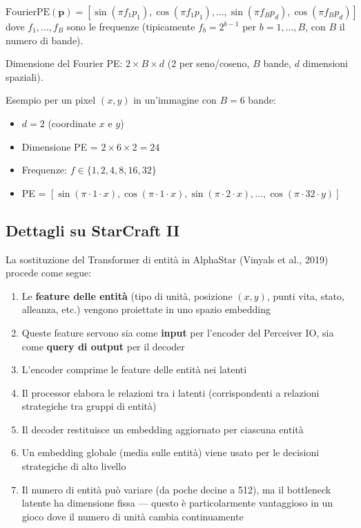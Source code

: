 \documentclass[12pt,a4paper]{article}
\begin{document}
\begin{formulabox}
\[
\text{FourierPE}(\mathbf{p}) = \left[\sin(\pi f_1 p_1), \cos(\pi f_1 p_1), \ldots, \sin(\pi f_B p_d), \cos(\pi f_B p_d)\right]
\]
dove $f_1, \ldots, f_B$ sono le frequenze (tipicamente $f_b = 2^{b-1}$ per $b = 1, \ldots, B$, con $B$ il numero di bande).

Dimensione del Fourier PE: $2 \times B \times d$ (2 per seno/coseno, $B$ bande, $d$ dimensioni spaziali).

Esempio per un pixel $(x, y)$ in un'immagine con $B = 6$ bande:
\begin{itemize}
    \item $d = 2$ (coordinate $x$ e $y$)
    \item Dimensione PE = $2 \times 6 \times 2 = 24$
    \item Frequenze: $f \in \{1, 2, 4, 8, 16, 32\}$
    \item PE = $[\sin(\pi \cdot 1 \cdot x), \cos(\pi \cdot 1 \cdot x), \sin(\pi \cdot 2 \cdot x), \ldots, \cos(\pi \cdot 32 \cdot y)]$
\end{itemize}
\end{formulabox}

\subsection{Dettagli su StarCraft II}

La sostituzione del Transformer di entit\`a in AlphaStar (Vinyals et al., 2019) procede come segue:

\begin{enumerate}
    \item Le \textbf{feature delle entit\`a} (tipo di unit\`a, posizione $(x, y)$, punti vita, stato, alleanza, etc.) vengono proiettate in uno spazio embedding
    \item Queste feature servono sia come \textbf{input} per l'encoder del Perceiver IO, sia come \textbf{query di output} per il decoder
    \item L'encoder comprime le feature delle entit\`a nei latenti
    \item Il processor elabora le relazioni tra i latenti (corrispondenti a relazioni strategiche tra gruppi di entit\`a)
    \item Il decoder restituisce un embedding aggiornato per ciascuna entit\`a
    \item Un embedding globale (media sulle entit\`a) viene usato per le decisioni strategiche di alto livello
    \item Il numero di entit\`a pu\`o variare (da poche decine a 512), ma il bottleneck latente ha dimensione fissa --- questo \`e particolarmente vantaggioso in un gioco dove il numero di unit\`a cambia continuamente
\end{enumerate}
\end{document}

